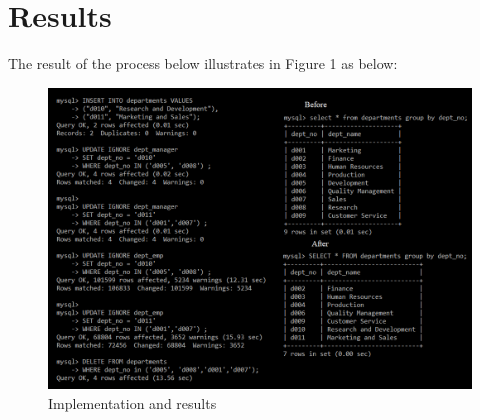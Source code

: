 \documentclass{article}
\begin{document}
\section*{Results}

The result of the process below illustrates in Figure 1 as below:\\
\begin{figure}[h]
\includegraphics[scale = 0.65]{result.PNG}
\caption{Implementation and results}
\end{figure}
\end{document}
